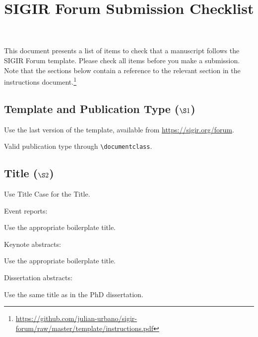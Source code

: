 \documentclass[news]{sigirforum}
\begin{document}
\title{SIGIR Forum Submission Checklist}

\maketitle 
\sloppy
\vspace{-1.5cm}
This document presents a list of items to check that a manuscript follows the SIGIR Forum template. Please check all items before you make a submission.
Note that the sections below contain a reference to the relevant section in the instructions document.\footnote{\url{https://github.com/julian-urbano/sigir-forum/raw/master/template/instructions.pdf}}

\subsection*{Template and Publication Type ($\S1$)}

\begin{checklist}
\item Use the last version of the template, available from \url{https://sigir.org/forum}.
\item Valid publication type through \texttt{\textbackslash documentclass}.
\end{checklist}

\subsection*{Title ($\S2$)}

\begin{checklist}
\item Use Title Case for the Title.
\item Event reports:
	\begin{checklist}
	\item Use the appropriate boilerplate title.
	\end{checklist}
\item Keynote abstracts:
	\begin{checklist}
	\item Use the appropriate boilerplate title.
	\end{checklist}
\item Dissertation abstracts:
	\begin{checklist}
	\item Use the same title as in the PhD dissertation.
	\end{checklist}
\end{checklist}
\end{document}
